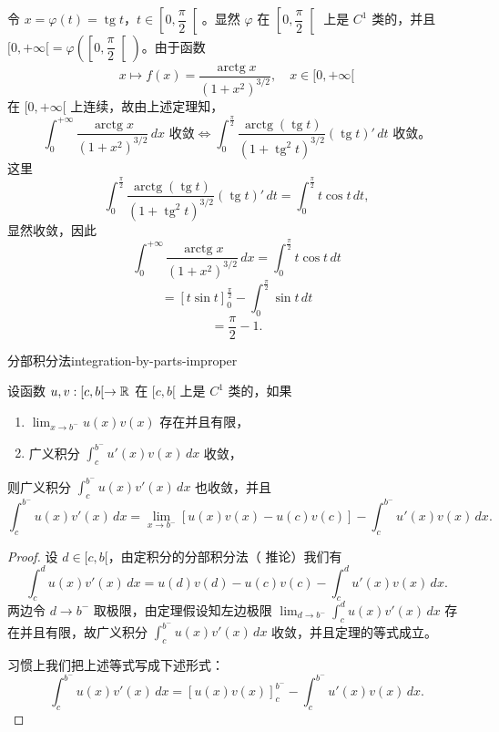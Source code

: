 令 $x=\varphi(t)=\operatorname{tg}t$，$t\in\left[0,\dfrac{\pi}{2}\right[$。显然 $\varphi$ 在 $\left[0,\dfrac{\pi}{2}\right[$ 上是 $C^1$ 类的，并且 $[0,+\infty[=\varphi\left(\left[0,\dfrac{\pi}{2}\right[\right)$。由于函数
\[x\longmapsto f(x)=\frac{\operatorname{arctg}x}{(1+x^2)^{3/2}},\quad x\in[0,+\infty[\]
在 $[0,+\infty[$ 上连续，故由上述定理知，
\[\int_0^{+\infty}\frac{\operatorname{arctg}x}{(1+x^2)^{3/2}}\,dx\text{ 收敛}\Longleftrightarrow\int_0^{\frac{\pi}{2}}\frac{\operatorname{arctg}(\operatorname{tg}t)}{(1+\operatorname{tg}^2t)^{3/2}}(\operatorname{tg}t)'\,dt\text{ 收敛。}\]
这里
\[\int_0^{\frac{\pi}{2}}\frac{\operatorname{arctg}(\operatorname{tg}t)}{(1+\operatorname{tg}^2t)^{3/2}}(\operatorname{tg}t)'\,dt=\int_0^{\frac{\pi}{2}}t\cos t\,dt,\]
显然收敛，因此
\[\int_0^{+\infty}\frac{\operatorname{arctg}x}{(1+x^2)^{3/2}}\,dx=\int_0^{\frac{\pi}{2}}t\cos t\,dt\]
\[=\left[t\sin t\right]_0^{\frac{\pi}{2}}-\int_0^{\frac{\pi}{2}}\sin t\,dt\]
\[=\frac{\pi}{2}-1.\]

\begin{mythm}{分部积分法}{integration-by-parts-improper}

设函数 $u,v:[c,b[\to\mathbb{R}$ 在 $[c,b[$ 上是 $C^1$ 类的，如果

\begin{enumerate}[label=\arabic{enumi})]
\item $\displaystyle\lim_{x\to b^-}u(x)v(x)$ 存在并且有限，
\item 广义积分 $\displaystyle\int_{c}^{b^-}u'(x)v(x)\,dx$ 收敛，
\end{enumerate}

则广义积分 $\displaystyle\int_{c}^{b^-}u(x)v'(x)\,dx$ 也收敛，并且
\[\int_{c}^{b^-}u(x)v'(x)\,dx=\lim_{x\to b^-}\left[u(x)v(x)-u(c)v(c)\right]-\int_{c}^{b^-}u'(x)v(x)\,dx.\]

\end{mythm}

\begin{proof}

设 $d\in[c,b[$，由定积分的分部积分法（ 推论）我们有
\[\int_{c}^{d}u(x)v'(x)\,dx=u(d)v(d)-u(c)v(c)-\int_{c}^{d}u'(x)v(x)\,dx.\]
两边令 $d\to b^-$ 取极限，由定理假设知左边极限 $\displaystyle\lim_{d\to b^-}\int_{c}^{d}u(x)v'(x)\,dx$ 存在并且有限，故广义积分 $\displaystyle\int_{c}^{b^-}u(x)v'(x)\,dx$ 收敛，并且定理的等式成立。

习惯上我们把上述等式写成下述形式：
\[\int_{c}^{b^-}u(x)v'(x)\,dx=\left[u(x)v(x)\right]_{c}^{b^-}-\int_{c}^{b^-}u'(x)v(x)\,dx.\]

\end{proof}

